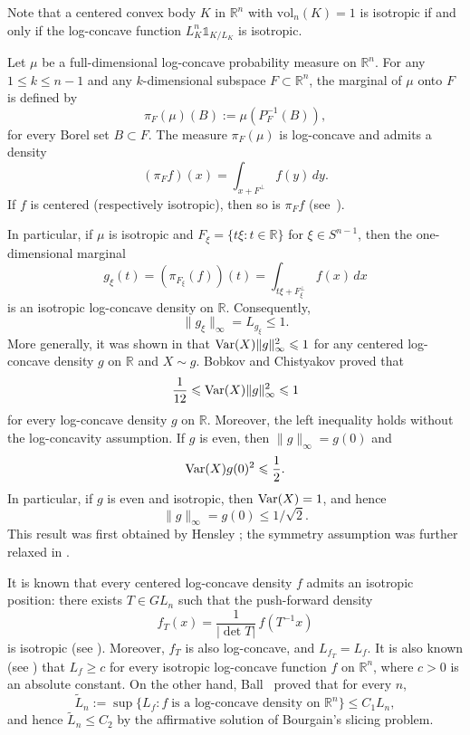 \documentclass[11pt,leqno]{article}
\theoremstyle{remark}
\numberwithin{equation}{section}
\newcommand{\vol}{\mathrm{vol}}
\newcommand{\ls}{\leqslant}
\newcommand{\gr}{\geqslant}
\begin{document}
Note that a centered convex body $K$ in $\mathbb{R}^n$ with $\vol_n(K)=1$ is isotropic if and only if the log-concave function $L_K^n\mathds{1}_{K/L_K}$ is isotropic.

Let $\mu$ be a full-dimensional log-concave probability measure on $\mathbb{R}^n$.
For any $1\ls k \ls n-1$ and any $k$-dimensional subspace $F\subset\mathbb{R}^n$, the marginal of $\mu$ onto $F$ is defined by
$$\pi_F(\mu)(B):=\mu(P_F^{-1}(B)),$$
for every Borel set $B\subset F$. The measure $\pi_F(\mu)$ is log-concave and admits a density
$$(\pi_F f)(x)=\int_{x+F^\perp} f(y)\,dy.$$
If $f$ is centered (respectively isotropic), then so is $\pi_F f$
(see~\cite[Proposition~5.1.11]{BGVV-book}).

In particular, if $\mu$ is isotropic and $F_{\xi}=\{t\xi:t\in\mathbb{R}\}$ for $\xi\in S^{n-1}$, 
then the one-dimensional marginal $$g_{\xi}(t)=(\pi_{F_{\xi}}(f))(t)=\int_{t\xi +F_{\xi}^{\perp}}f(x)\,dx$$
is an isotropic log-concave density on $\mathbb{R}$. Consequently,
\begin{equation}\label{eq:dim-1}\|g_{\xi}\|_{\infty}=L_{g_{\xi}}\ls 1.\end{equation}
More generally, it was shown in \cite{Fradelizi-1997} that ${\rm Var}(X)\|g\|_{\infty}^2\ls 1$ for any 
centered log-concave density $g$ on $\mathbb{R}$ and $X\sim g$. Bobkov and Chistyakov \cite[Proposition~2.1]{Bobkov-Chistyakov-2015} proved that
$$\frac{1}{12}\ls {\rm Var}(X)\|g\|_{\infty}^2\ls 1$$
for every log-concave density $g$ on $\mathbb{R}$. Moreover, the left inequality holds without the log-concavity
assumption. If $g$ is even, then
$\|g\|_{\infty}=g(0)$ and
$${\rm Var}(X)g(0)^2\ls\frac{1}{2}.$$
In particular, if $g$ is even and isotropic, then ${\rm Var}(X)=1$, and hence 
\begin{equation}\label{eq:dim-12}\|g\|_{\infty}=g(0)\ls 1/\sqrt{2}.\end{equation}
This result was first obtained by Hensley \cite{Hensley-1980}; the symmetry assumption was further relaxed in \cite{Bobkov-1999}.

\smallskip


It is known that every centered log-concave density $f$ admits an isotropic position: there exists $T\in GL_n$ such that the push-forward density
$$f_T(x)=\frac{1}{|\det T|}\,f(T^{-1}x)$$
is isotropic (see \cite[Section~2.3]{BGVV-book}).
Moreover, $f_T$ is also log-concave, and $L_{f_T}=L_f$. It is also known (see \cite[Proposition~2.3.12]{BGVV-book}) that $L_f\gr c$ for every
isotropic log-concave function $f$ on $\mathbb{R}^n$, where $c>0$ is an absolute constant. On the other hand, Ball~\cite{Ball-1988} proved that for every $n$,
$$\tilde{L}_n:=\sup\big\{L_f: f\;\text{is a log-concave density on $\mathbb{R}^n$}\big\}\ls C_1L_n,$$
and hence $\tilde{L}_n\ls C_2$ by the affirmative solution of Bourgain's slicing problem. 
\end{document}
